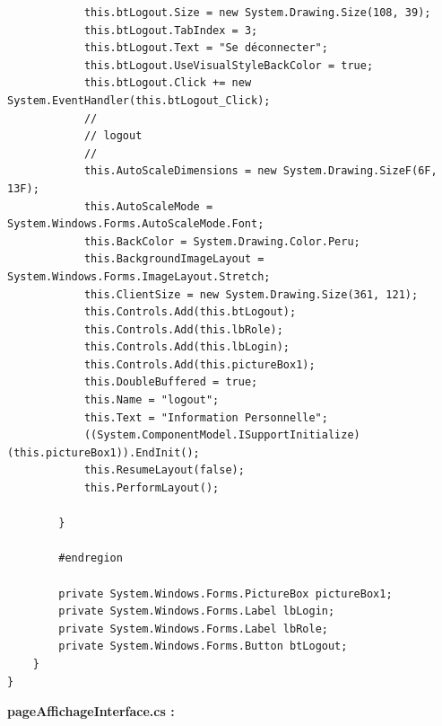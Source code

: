 \documentclass[main.tex]{subfiles}
\begin{document}
\begin{lstlisting}
            this.btLogout.Size = new System.Drawing.Size(108, 39);
            this.btLogout.TabIndex = 3;
            this.btLogout.Text = "Se déconnecter";
            this.btLogout.UseVisualStyleBackColor = true;
            this.btLogout.Click += new System.EventHandler(this.btLogout_Click);
            // 
            // logout
            // 
            this.AutoScaleDimensions = new System.Drawing.SizeF(6F, 13F);
            this.AutoScaleMode = System.Windows.Forms.AutoScaleMode.Font;
            this.BackColor = System.Drawing.Color.Peru;
            this.BackgroundImageLayout = System.Windows.Forms.ImageLayout.Stretch;
            this.ClientSize = new System.Drawing.Size(361, 121);
            this.Controls.Add(this.btLogout);
            this.Controls.Add(this.lbRole);
            this.Controls.Add(this.lbLogin);
            this.Controls.Add(this.pictureBox1);
            this.DoubleBuffered = true;
            this.Name = "logout";
            this.Text = "Information Personnelle";
            ((System.ComponentModel.ISupportInitialize)(this.pictureBox1)).EndInit();
            this.ResumeLayout(false);
            this.PerformLayout();

        }

        #endregion

        private System.Windows.Forms.PictureBox pictureBox1;
        private System.Windows.Forms.Label lbLogin;
        private System.Windows.Forms.Label lbRole;
        private System.Windows.Forms.Button btLogout;
    }
}
\end{lstlisting}


\textbf{pageAffichageInterface.cs :}
\end{document}
